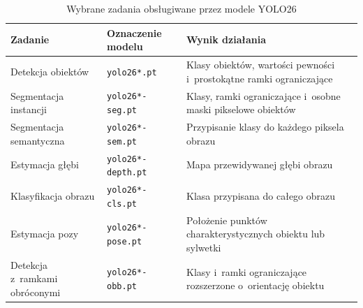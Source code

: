 \begin{table}[H] %
    \centering
    \small
    \renewcommand{\arraystretch}{1.2}
    \caption{Wybrane zadania obsługiwane przez modele YOLO26}
    \label{tab:yolo26_zadania}
    \begin{tabularx}{\textwidth}{
        >{\raggedright\arraybackslash}p{3.2cm}
        >{\raggedright\arraybackslash}p{3.2cm}
        >{\raggedright\arraybackslash}X
        }
        \toprule
        \textbf{Zadanie}              &
        \textbf{Oznaczenie modelu}    &
        \textbf{Wynik działania}                                            \\
        \midrule

        Detekcja obiektów             &
        \texttt{yolo26*.pt}           &
        Klasy obiektów, wartości pewności i~prostokątne ramki ograniczające \\

        Segmentacja instancji         &
        \texttt{yolo26*-seg.pt}       &
        Klasy, ramki ograniczające i~osobne maski pikselowe obiektów        \\

        Segmentacja semantyczna       &
        \texttt{yolo26*-sem.pt}       &
        Przypisanie klasy do każdego piksela obrazu                         \\

        Estymacja głębi               &
        \texttt{yolo26*-depth.pt}     &
        Mapa przewidywanej głębi obrazu                                     \\

        Klasyfikacja obrazu           &
        \texttt{yolo26*-cls.pt}       &
        Klasa przypisana do całego obrazu                                   \\

        Estymacja pozy                &
        \texttt{yolo26*-pose.pt}      &
        Położenie punktów charakterystycznych obiektu lub sylwetki          \\

        Detekcja z~ramkami obróconymi &
        \texttt{yolo26*-obb.pt}       &
        Klasy i~ramki ograniczające rozszerzone o~orientację obiektu        \\

        \bottomrule
    \end{tabularx}
\end{table}

